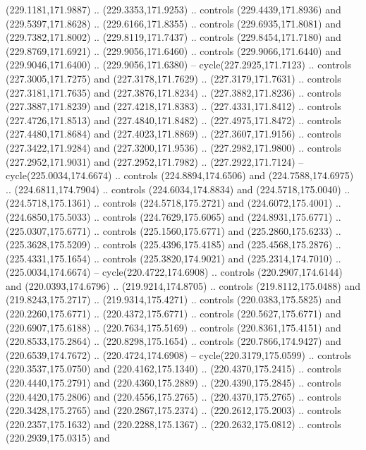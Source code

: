 \begin{scope}[cm={{1.25,0.0,0.0,-1.25,(0.0,442.91375)}}]
    (229.1181,171.9887) .. (229.3353,171.9253) .. controls (229.4439,171.8936) and
    (229.5397,171.8628) .. (229.6166,171.8355) .. controls (229.6935,171.8081) and
    (229.7382,171.8002) .. (229.8119,171.7437) .. controls (229.8454,171.7180) and
    (229.8769,171.6921) .. (229.9056,171.6460) .. controls (229.9066,171.6440) and
    (229.9046,171.6400) .. (229.9056,171.6380) -- cycle(227.2925,171.7123) ..
    controls (227.3005,171.7275) and (227.3178,171.7629) .. (227.3179,171.7631) ..
    controls (227.3181,171.7635) and (227.3876,171.8234) .. (227.3882,171.8236) ..
    controls (227.3887,171.8239) and (227.4218,171.8383) .. (227.4331,171.8412) ..
    controls (227.4726,171.8513) and (227.4840,171.8482) .. (227.4975,171.8472) ..
    controls (227.4480,171.8684) and (227.4023,171.8869) .. (227.3607,171.9156) ..
    controls (227.3422,171.9284) and (227.3200,171.9536) .. (227.2982,171.9800) ..
    controls (227.2952,171.9031) and (227.2952,171.7982) .. (227.2922,171.7124) --
    cycle(225.0034,174.6674) .. controls (224.8894,174.6506) and
    (224.7588,174.6975) .. (224.6811,174.7904) .. controls (224.6034,174.8834) and
    (224.5718,175.0040) .. (224.5718,175.1361) .. controls (224.5718,175.2721) and
    (224.6072,175.4001) .. (224.6850,175.5033) .. controls (224.7629,175.6065) and
    (224.8931,175.6771) .. (225.0307,175.6771) .. controls (225.1560,175.6771) and
    (225.2860,175.6233) .. (225.3628,175.5209) .. controls (225.4396,175.4185) and
    (225.4568,175.2876) .. (225.4331,175.1654) .. controls (225.3820,174.9021) and
    (225.2314,174.7010) .. (225.0034,174.6674) -- cycle(220.4722,174.6908) ..
    controls (220.2907,174.6144) and (220.0393,174.6796) .. (219.9214,174.8705) ..
    controls (219.8112,175.0488) and (219.8243,175.2717) .. (219.9314,175.4271) ..
    controls (220.0383,175.5825) and (220.2260,175.6771) .. (220.4372,175.6771) ..
    controls (220.5627,175.6771) and (220.6907,175.6188) .. (220.7634,175.5169) ..
    controls (220.8361,175.4151) and (220.8533,175.2864) .. (220.8298,175.1654) ..
    controls (220.7866,174.9427) and (220.6539,174.7672) .. (220.4724,174.6908) --
    cycle(220.3179,175.0599) .. controls (220.3537,175.0750) and
    (220.4162,175.1340) .. (220.4370,175.2415) .. controls (220.4440,175.2791) and
    (220.4360,175.2889) .. (220.4390,175.2845) .. controls (220.4420,175.2806) and
    (220.4556,175.2765) .. (220.4370,175.2765) .. controls (220.3428,175.2765) and
    (220.2867,175.2374) .. (220.2612,175.2003) .. controls (220.2357,175.1632) and
    (220.2288,175.1367) .. (220.2632,175.0812) .. controls (220.2939,175.0315) and

\end{scope}
